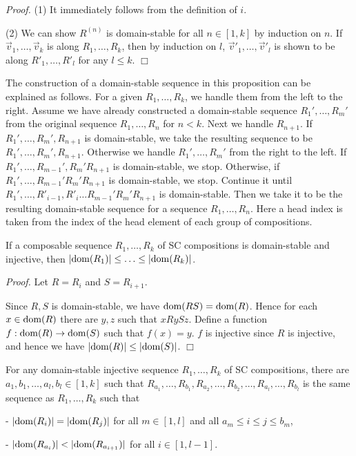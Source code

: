 {\em Proof.}
(1) It immediately follows from the definition of $i$.

(2) We can show $R^{(n)}$ is domain-stable for all $n \in [1,k]$
by induction on $n$.
If $\Vec v_1,\ldots,\Vec v_k$ is along $R_1,\ldots,R_k$,
then by induction on $l$,
$\Vec v'_1,\ldots,\Vec v'_l$ is shown to be along $R'_1,\ldots,R'_l$
for any $l \le k$.
$\Box$

The construction of a domain-stable sequence 
in this proposition can be explained as follows.
For a given $R_1,\ldots,R_k$,
we handle them from the left to the right.
Assume we have already constructed a domain-stable sequence $R_1',\ldots,R_m'$
from the original sequence $R_1,\ldots,R_n$ for $n<k$.
Next we handle $R_{n+1}$. If $R_1',\ldots,R_m',R_{n+1}$ is
domain-stable, we take the resulting sequence to be
$R_1',\ldots,R_m',R_{n+1}$.
Otherwise we handle $R_1',\ldots,R_m'$ from the right to the left.
If $R_1',\ldots,R_{m-1}', R_m'  R_{n+1}$ is domain-stable, we stop.
Otherwise, if $R_1',\ldots,R_{m-1}'  R_m'  R_{n+1}$ is domain-stable,
we stop. Continue it until
$R_1',\ldots,R'_{i-1},R'_i \ldots R_{m-1}' R_m'  R_{n+1}$ is domain-stable.
Then we take it to be the resulting domain-stable sequence
for a sequence $R_1,\ldots,R_n$.
Here a head index is taken from the index of the head element of each group
of compositions.

\begin{Lemma}\label{lemma:domain-stable-increase}
If
a composable sequence $R_1,\ldots,R_k$ of SC compositions
is domain-stable and injective, then
$|{\rm dom}(R_1)| \le \ldots \le |{\rm dom}(R_k)|$.
\end{Lemma}

{\em Proof.}
Let $R = R_i$ and $S = R_{i+1}$.

Since $R,S$ is domain-stable, we have ${\rm dom}(RS) = {\rm dom}(R)$.
Hence for each $x \in {\rm dom}(R)$ there are $y,z$ such that $x R y S z$.
Define a function $f: {\rm dom}(R) \to {\rm dom}(S)$ such that $f(x)=y$.
$f$ is injective since $R$ is injective, 
and hence we have $|{\rm dom}(R)| \le |{\rm dom}(S)|$.
$\Box$

\begin{Lemma}\label{lemma:cardinal-constant}
For any 
domain-stable injective
sequence $R_1,\ldots,R_k$ of SC compositions,
there are $a_1,b_1,\ldots, a_l,b_l \in [1,k]$ such that
$R_{a_1},\ldots,R_{b_1},R_{a_2},\ldots,R_{b_2},\ldots,R_{a_l},\ldots,R_{b_l}$
is the same sequence as $R_1,\ldots,R_k$ such that

- $|{\rm dom}(R_i)| = |{\rm dom}(R_j)|$ for all $m \in [1,l]$ and
all $a_m \le i \le j \le b_m$,

- $|{\rm dom}(R_{a_i})| < |{\rm dom}(R_{a_{i+1}})|$ for all $i \in [1,l-1]$.

\end{Lemma}

